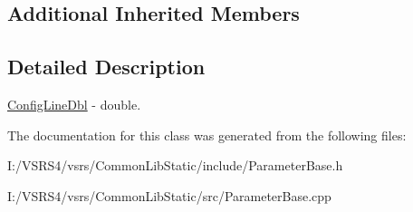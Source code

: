 \subsection*{Additional Inherited Members}


\subsection{Detailed Description}
\hyperlink{class_config_line_dbl}{Config\+Line\+Dbl} -\/ double. 

The documentation for this class was generated from the following files\+:\begin{DoxyCompactItemize}
\item 
I\+:/\+V\+S\+R\+S4/vsrs/\+Common\+Lib\+Static/include/Parameter\+Base.\+h\item 
I\+:/\+V\+S\+R\+S4/vsrs/\+Common\+Lib\+Static/src/Parameter\+Base.\+cpp\end{DoxyCompactItemize}
